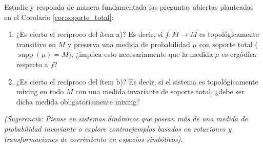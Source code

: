 \begin{ejercicio}
	Estudie y responda de manera fundamentada las preguntas abiertas planteadas en el Corolario \ref{cor:soporte_total}:
	\begin{enumerate}[1)]
		\item ¿Es cierto el recíproco del ítem a)? Es decir, si $f: M \to M$ es topológicamente transitivo en $M$ y preserva una medida de probabilidad $\mu$ con soporte total ($\operatorname{supp}(\mu) = M$), ¿implica esto necesariamente que la medida $\mu$ es ergódica respecto a $f$?
		\item ¿Es cierto el recíproco del ítem b)? Es decir, si el sistema es topológicamente mixing en todo $M$ con una medida invariante de soporte total, ¿debe ser dicha medida obligatoriamente mixing?
	\end{enumerate}
	\textit{(Sugerencia: Piense en sistemas dinámicos que posean más de una medida de probabilidad invariante o explore contraejemplos basados en rotaciones y transformaciones de corrimiento en espacios simbólicos).}
\end{ejercicio}

